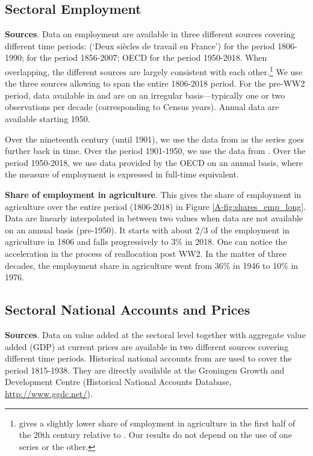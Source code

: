 \documentclass[11pt]{report}
\begin{document}
\subsection{Sectoral Employment}\label{A-sec:sectoral-employment}

\textbf{Sources}. Data on employment are available in three different sources covering different time periods: \cite{marchand1991deux} (`Deux siècles de travail en France') for the period 1806-1990; \cite{herrendorf2014growth} for the period 1856-2007; OECD for the period 1950-2018. When overlapping, the different sources are largely consistent with each other.\footnote{\cite{marchand1991deux} gives a slightly lower share of employment in agriculture in the first half of the 20th century relative to \cite{herrendorf2014growth}. Our results do not depend on the use of one series or the other.} We use the three sources allowing to span the entire 1806-2018 period. For the pre-WW2 period, data available in \cite{marchand1991deux} and \cite{herrendorf2014growth} are on an irregular basis---typically one or two observations per decade (corresponding to Census years). Annual data are available starting 1950.

Over the nineteenth century (until 1901), we use the data from \cite{marchand1991deux} as the series goes further back in time. Over the period 1901-1950, we use the data from \cite{herrendorf2014growth}. Over the period 1950-2018, we use data provided by the OECD on an annual basis, where the measure of employment is expressed in full-time equivalent. 

\textbf{Share of employment in agriculture}. This gives the share of employment in agriculture over the entire period (1806-2018) in Figure \ref{A-fig:shares_emp_long}. Data are linearly interpolated in between two values when data are not available on an annual basis (pre-1950). It starts with about 2/3 of the employment in agriculture in 1806 and falls progressively to 3\% in 2018. One can notice the acceleration in the process of reallocation post WW2. In the matter of three decades, the employment share in agriculture went from 36\% in 1946 to 10\% in 1976. 



\subsection{Sectoral National Accounts and Prices}\label{A-sec:national-accounts} 

\textbf{Sources}. Data on value added at the sectoral level together with aggregate value added (GDP) at current prices are available in two different sources covering different time periods. Historical national accounts from \cite{toutain1987produit} are used to cover the period 1815-1938. They are directly available at the Groningen Growth and Development Centre (Historical National Accounts Database, \url{http://www.ggdc.net/}). 
\end{document}
